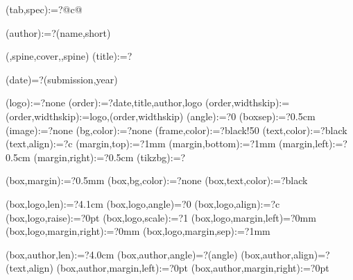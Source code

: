 
%


\makeatletter



\spine(tab,spec):=?{{@{}c@{}}}

\spine(author):=?{\thedocauthor(name,short)}

({\@LANG@COVER,spine,cover},{\@LANG@COVER,spine})%
\spine(title):=?{\match}

\spine(date)=?{\thentdocdate(submission,year)}

\spine(logo):=?{none}
\spine(order):=?{date,title,author,logo}
\spine(order,widthskip):={}
\spine(order,widthskip):={logo,\thespine(order,widthskip)}
\spine(angle):=?{0}
\spine(boxsep):=?{0.5cm}
\spine(image):=?{none}
\spine(bg,color):=?{none}
\spine(frame,color):=?{black!50}
\spine(text,color):=?{black}
\spine(text,align):=?{c}
\spine(margin,top):=?{1mm}
\spine(margin,bottom):=?{1mm}
\spine(margin,left):=?{0.5cm}
\spine(margin,right):=?{0.5cm}
\spine(tikzbg):=?{}

\spine(box,margin):=?{0.5mm}
\spine(box,bg,color):=?{none}
\spine(box,text,color):=?{black}

\spine(box,logo,len):=?{4.1cm}
\spine(box,logo,angle)=?{0}
\spine(box,logo,align):=?{c}
\spine(box,logo,raise):=?{0pt}
\spine(box,logo,scale):=?{1}
\spine(box,logo,margin,left)=?{0mm}
\spine(box,logo,margin,right):=?{0mm}
\spine(box,logo,margin,sep):=?{1mm}

\spine(box,author,len):=?{4.0cm}
\spine(box,author,angle)=?{\thespine(angle)}
\spine(box,author,align)=?{\thespine(text,align)}
\spine(box,author,margin,left):=?{0pt}
\spine(box,author,margin,right):=?{0pt}

